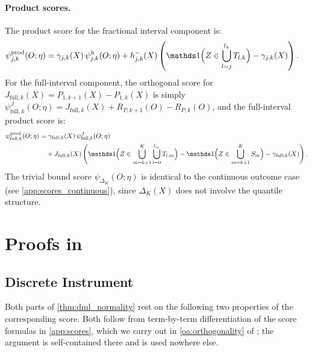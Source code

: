 \paragraph{Product scores.} The product score for the fractional interval component is:
\begin{align*}
    \psi_{j,k}^{\text{prod}}(O; \eta) &= \gamma_{j,k}(X)\, \psi_{j,k}^{h}(O; \eta) + h_{j,k}^{-}(X) \left(\indicator\Big(Z \in \bigcup_{l=j}^{l_k} T_{l,k}\Big) - \gamma_{j,k}(X)\right).
\end{align*}
For the full-interval component, the orthogonal score for $J_{\text{full},k}(X) = P_{1,k+1}(X) - P_{1,k}(X)$ is simply $\psi_{\text{full},k}^{J}(O; \eta) = J_{\text{full},k}(X) + R_{P,k+1}(O) - R_{P,k}(O)$, and the full-interval product score is:
\begin{align*}
    \psi_{\text{full},k}^{\text{prod}}(O; \eta) &= \gamma_{\text{full},k}(X)\,\psi_{\text{full},k}^{J}(O; \eta) \\
    &\quad + J_{\text{full},k}(X)\left(\indicator\Big(Z \in \bigcup_{m=k+1}^{K} \bigcup_{l=0}^{l_m} T_{l,m}\Big) - \indicator\Big(Z \in \bigcup_{m=k+1}^{K} S_m\Big) - \gamma_{\text{full},k}(X)\right).
\end{align*}
The trivial bound score $\psi_{\Delta_K}(O; \eta)$ is identical to the continuous outcome case (see \cref{app:scores_continuous}), since $\Delta_K(X)$ does not involve the quantile structure.


\section{Proofs in \protect{}}\label{app:proofs_est_inf}

\subsection{Discrete Instrument}

Both parts of \cref{thm:dml_normality} rest on the following two properties of the corresponding score. Both follow from term-by-term differentiation of the score formulas in \cref{app:scores}, which we carry out in \cref{oa:orthogonality} of \oalocation; the argument is self-contained there and is used nowhere else.


